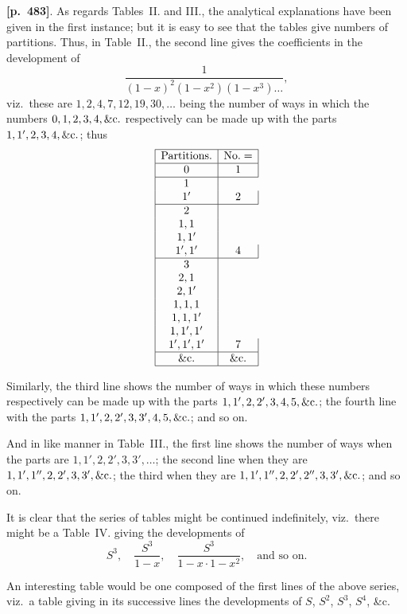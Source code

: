\documentclass[11pt,a4paper]{article}
\begin{document}
\noindent\textbf{[p.~483]}. As regards Tables~II. and III., the analytical explanations have been given in the first instance; but it is easy to see that the tables give numbers of partitions. Thus, in Table~II., the second line gives the coefficients in the development of
\[
\frac{1}{(1-x)^{2}(1-x^{2})(1-x^{3})\ldots},
\]
viz.\ these are $1, 2, 4, 7, 12, 19, 30, \ldots$ being the number of ways in which the numbers $0, 1, 2, 3, 4, \&{\rm c.}$ respectively can be made up with the parts $1, 1', 2, 3, 4, \&{\rm c.}$; thus
\[
\begin{array}{|c|c|}
\hline
\text{Partitions.} & \text{No.} = \\
\hline
0 & 1 \\
\hline
1 \\ 1' & 2 \\
\hline
2 \\ 1,1 \\ 1, 1' \\ 1', 1' & 4 \\
\hline
3 \\ 2, 1 \\ 2, 1' \\ 1, 1, 1 \\ 1, 1, 1' \\ 1, 1', 1' \\ 1', 1', 1' & 7 \\
\hline
\&\text{c.} & \&\text{c.} \\
\hline
\end{array}
\]

Similarly, the third line shows the number of ways in which these numbers respectively can be made up with the parts $1, 1', 2, 2', 3, 4, 5, \&{\rm c.}$; the fourth line with the parts $1, 1', 2, 2', 3, 3', 4, 5, \&{\rm c.}$; and so on.

And in like manner in Table~III., the first line shows the number of ways when the parts are $1, 1', 2, 2', 3, 3', \ldots$; the second line when they are $1, 1', 1'', 2, 2', 3, 3', \&{\rm c.}$; the third when they are $1, 1', 1'', 2, 2', 2'', 3, 3', \&{\rm c.}$; and so on.

It is clear that the series of tables might be continued indefinitely, viz.\ there might be a Table~IV. giving the developments of
\[
S^{3},\quad \frac{S^{3}}{1-x},\quad \frac{S^{3}}{1-x \cdot 1-x^{2}},\quad \text{and so on.}
\]

An interesting table would be one composed of the first lines of the above series, viz.\ a table giving in its successive lines the developments of $S$, $S^{2}$, $S^{3}$, $S^{4}$, \&c.
\end{document}
